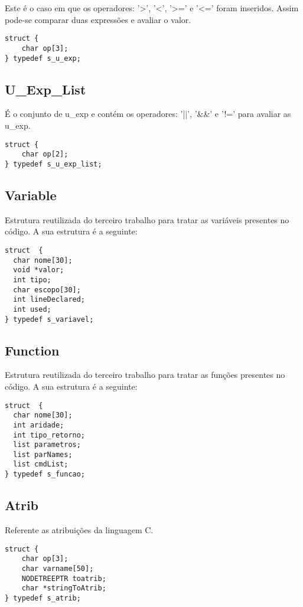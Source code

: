 \documentclass[a4paper,10pt]{article}
\begin{document}
Este é o caso em que os operadores: '>', '<', '>=' e '<=' foram inseridos. Assim pode-se comparar duas expressões e avaliar o valor.

\begin{lstlisting}
struct {
	char op[3];
} typedef s_u_exp;
\end{lstlisting}

\subsection{U\_Exp\_List}

É o conjunto de u\_exp e contém os operadores: '||', '\&\&' e '!=' para avaliar as u\_exp.

\begin{lstlisting}
struct {
	char op[2];
} typedef s_u_exp_list;
\end{lstlisting}

\subsection{Variable}

Estrutura reutilizada do terceiro trabalho para tratar as variáveis presentes no código. A sua estrutura é a seguinte:

\begin{lstlisting}
struct  {
  char nome[30];
  void *valor;
  int tipo;
  char escopo[30];
  int lineDeclared;
  int used;
} typedef s_variavel;
\end{lstlisting}

\subsection{Function}

Estrutura reutilizada do terceiro trabalho para tratar as funções presentes no código. A sua estrutura é a seguinte:

\begin{lstlisting}
struct  {
  char nome[30];
  int aridade;
  int tipo_retorno;
  list parametros;
  list parNames;
  list cmdList;
} typedef s_funcao;
\end{lstlisting}
\subsection{Atrib}

Referente as atribuições da linguagem C. 

\begin{lstlisting}
struct {
	char op[3];
	char varname[50];
	NODETREEPTR toatrib;
	char *stringToAtrib;
} typedef s_atrib;
\end{lstlisting}
\end{document}
